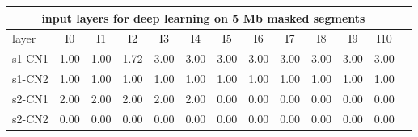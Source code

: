 \documentclass{standalone}
\begin{document}
\begin{tabular}{|l|c|c|c|c|c|c|c|c|c|c|c|c|}
\hline
\multicolumn{12}{|c|}{\textbf{input layers for deep learning on 5 Mb masked segments}}\\
\hline 

layer & I0 & I1 & I2 & I3 & I4 & I5 & I6 & I7 & I8 & I9 & I10 \\
\hline
s1-CN1 & 1.00 & 1.00 & 1.72 & 3.00 & 3.00 & 3.00 & 3.00 & 3.00 & 3.00 & 3.00 & 3.00 \\
s1-CN2 & 1.00 & 1.00 & 1.00 & 1.00 & 1.00 & 1.00 & 1.00 & 1.00 & 1.00 & 1.00 & 1.00 \\
s2-CN1 & 2.00 & 2.00 & 2.00 & 2.00 & 2.00 & 0.00 & 0.00 & 0.00 & 0.00 & 0.00 & 0.00 \\
s2-CN2 & 0.00 & 0.00 & 0.00 & 0.00 & 0.00 & 0.00 & 0.00 & 0.00 & 0.00 & 0.00 & 0.00 \\
\hline
\end{tabular}
\end{document}
